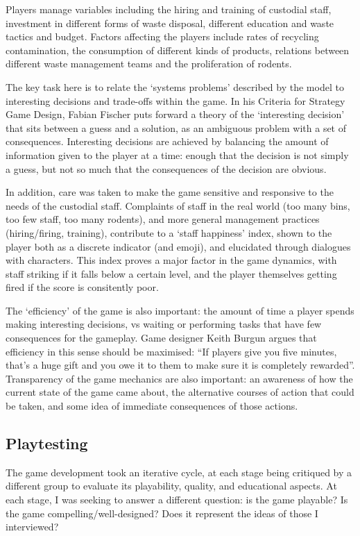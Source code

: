 \documentclass[nofonts,nols,justified,nobib]{tufte-book}
\begin{document}
Players manage variables including the hiring and training of custodial staff, investment in different forms of waste disposal, different education and waste tactics and budget. Factors affecting the players include rates of recycling contamination, the consumption of different kinds of products, relations between different waste management teams and the proliferation of rodents.

The key task here is to relate the `systems problems' described by the model to interesting decisions and trade-offs within the game. In his Criteria for Strategy Game Design, Fabian Fischer \cite{fischer_criteria_2014} puts forward a theory of the `interesting decision' that sits between a guess and a solution, as an ambiguous problem with a set of consequences. Interesting decisions are achieved by balancing the amount of information given to the player at a time: enough that the decision is not simply a guess, but not so much that the consequences of the decision are obvious.

In addition, care was taken to make the game sensitive and responsive to the needs of the custodial staff. Complaints of staff in the real world (too many bins, too few staff, too many rodents), and more general management practices (hiring/firing, training), contribute to a `staff happiness' index, shown to the player both as a discrete indicator (and emoji), and elucidated through dialogues with characters. This index proves a major factor in the game dynamics, with staff striking if it falls below a certain level, and the player themselves getting fired if the score is consitently poor.

The `efficiency' of the game is also important: the amount of time a player spends making interesting decisions, vs waiting or performing tasks that have few consequences for the gameplay. Game designer Keith Burgun argues that efficiency in this sense should be maximised: ``If players give you five minutes, that's a huge gift and you owe it to them to make sure it is completely rewarded''. Transparency of the game mechanics are also important: an awareness of how the current state of the game came about, the alternative courses of action that could be taken, and some idea of immediate consequences of those actions. 

\subsection*{Playtesting}

The game development took an iterative cycle, at each stage being critiqued by a different group to evaluate its playability, quality, and educational aspects. At each stage, I was seeking to answer a different question: is the game playable? Is the game compelling/well-designed? Does it represent the ideas of those I interviewed? 
\end{document}

